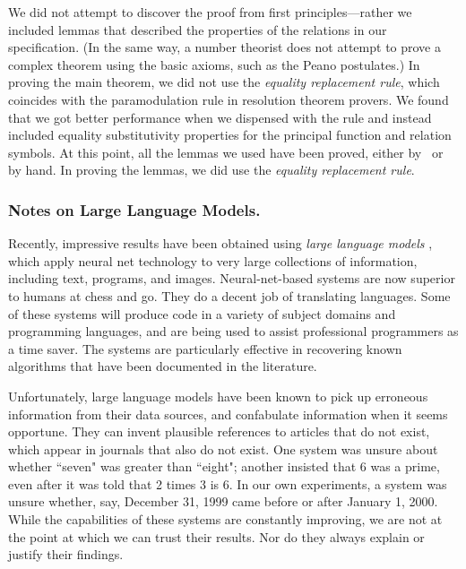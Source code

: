 \documentclass[runningheads]{llncs}
\begin{document}
We did not attempt to discover the proof from first principles---rather we included lemmas that described the properties of the relations in our specification. (In the same way, a number theorist does not attempt to prove a complex theorem using the basic axioms, such as the Peano postulates.)  In proving the main theorem, we did not use the \emph{equality replacement rule}, which coincides with the paramodulation rule in resolution theorem provers. We found that we got better performance when we dispensed with the rule and instead included equality substitutivity properties for the principal function and relation symbols. At this point, all the lemmas we used have been proved, either by \SNARK\ or by hand. In proving the lemmas, we did use the \emph{equality replacement rule}.

\subsubsection{Notes on Large Language Models.}  Recently, impressive results have been obtained using \emph{large language models}  \citep{wik:llm}, which  apply neural net technology to very large collections of information, including text, programs, and images.  Neural-net-based systems are now superior to humans at chess and go. They do a decent job of translating languages.  Some of these systems will produce code in a variety of subject domains and programming languages, and are being used to assist professional programmers as a time saver.  The systems are particularly effective in recovering known algorithms that have been documented in the literature.  

Unfortunately, large language models have been known to pick up erroneous information from their data sources, and confabulate information when it seems opportune.  They can invent plausible references to articles that do not exist, which appear in journals that also do not exist.  One system was unsure about whether “seven" was greater than “eight"; another insisted that 6 was a prime, even after it was told that 2 times 3 is 6.  In our own experiments, a system was unsure whether, say, December 31, 1999 came before or after January 1, 2000.  While the capabilities of these systems are constantly improving, we are not at the point at which we can trust their results. Nor do they always explain or justify their findings.
\end{document}
